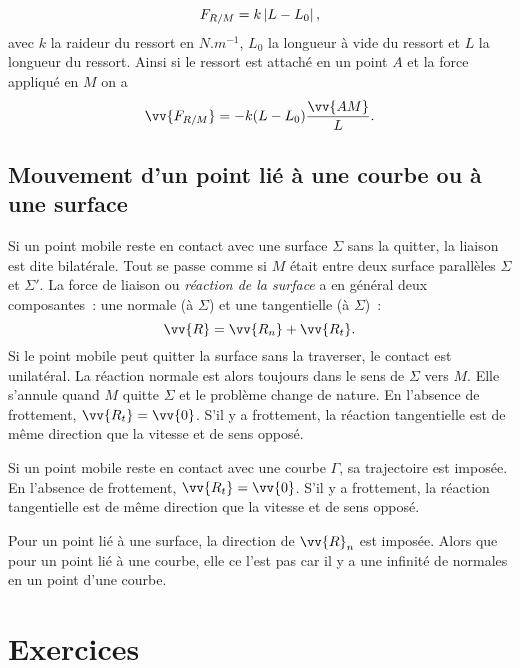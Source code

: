 \begin{equation}%
  F_{R/M} = k\abs{L-L_0},
\end{equation}%
avec \(k\) la raideur du ressort en \(\si{N.m^{-1}}\), \(L_0\) la longueur à 
vide du
ressort et \(L\) la longueur du ressort. Ainsi si le ressort est attaché en un
point \(A\) et la force appliqué en \(M\) on a
\begin{equation}%
  \vv{F_{R/M}} = -k(L-L_0) \frac{\vv{AM}}{L}.
\end{equation}%

\subsection{Mouvement d'un point lié à une courbe ou à une surface}%
\label{chap2-subsec:mouvementlieaunecourbe}%

Si un point mobile reste en contact avec une surface \(\Sigma\) sans la
quitter, la liaison est dite bilatérale. Tout se passe comme si \(M\) était
entre deux surface parallèles \(\Sigma\) et \(\Sigma'\). La force de liaison ou
\emph{réaction de la surface} a en général deux composantes~: une normale%
(à \(\Sigma\)) et une tangentielle (à \(\Sigma\))~:
\begin{equation}%
  \vv{R} = \vv{R_n} + \vv{R_t}.
\end{equation}%
Si le point mobile peut quitter la surface sans la traverser, le contact est
unilatéral. La réaction normale est alors toujours dans le sens de \(\Sigma\) 
vers
\(M\). Elle s'annule quand \(M\) quitte \(\Sigma\) et le problème change de 
nature. En
l'absence de frottement, \(\vv{R_t}=\vv{0}\). S'il y a frottement, la réaction
tangentielle est de même direction que la vitesse et de sens opposé.

Si un point mobile reste en contact avec une courbe \(\Gamma\), sa
trajectoire est imposée. En l'absence de frottement, \(\vv{R_t}=\vv{0}\).
S'il y a frottement, la réaction tangentielle est de même direction que la
vitesse et de sens opposé.

Pour un point lié à une surface, la direction de \(\vv{R}_n\) est imposée.
Alors que pour un point lié à une courbe, elle ce l'est pas car il y a une
infinité de normales en un point d'une courbe.

\clearpage
\section{Exercices}%
\label{chap2-sec:exercices}%

